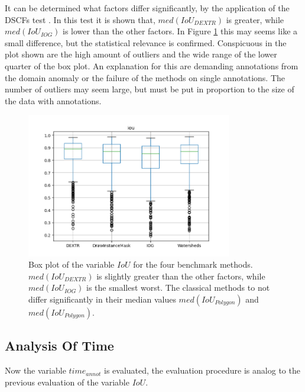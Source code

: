 It can be determined what factors differ significantly, by the application of the DSCFs  test \cite{CF91-dscf}.
In this test it is shown that, $ med \left( IoU_{DEXTR} \right) $ is greater, while $ med \left( IoU_{IOG} \right) $ is lower than the other factors. 
In Figure \ref{fig:ch5:sec1:iou_box_plot} this may seems like a small difference, but the statistical relevance is confirmed.
Conspicuous in the plot shown are the high amount of outliers and the wide range of the lower quarter of the box plot.
An explanation for this are demanding annotations from the domain anomaly or the failure of the methods on single annotations.
The number of outliers may seem large, but must be put in proportion to the size of the data with \getNumberBenchmarkAnnotations \space annotations.

\begin{figure}
	\centering
	\includegraphics[width=0.8\textwidth]{figures/chap51_boxplot_iou.png}
	\caption[Box plot IoU per method]{
		Box plot of the variable $ IoU $ for the four benchmark methods.
		$ med \left( IoU_{DEXTR} \right) $ is slightly greater than the other factors, while $ med \left( IoU_{IOG} \right) $ is the smallest worst.
		The classical methods to not differ significantly in their median values $ med \left( IoU_{Polygon} \right) $ and $ med \left( IoU_{Polygon} \right) $.
	} \label{fig:ch5:sec1:iou_box_plot}
\end{figure}



\subsection{Analysis Of Time}\label{ord:ch5:sec1:subsec3}
Now the variable $time_{annot}$ is evaluated, the evaluation procedure is analog to the previous evaluation of the variable $IoU$.

